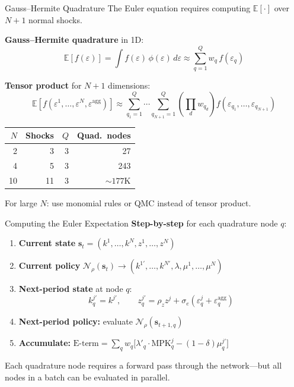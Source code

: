 \documentclass[aspectratio=169,11pt]{beamer}
\newcommand{\emphc}[1]{\textcolor{harvardcrimson}{#1}}
\newcommand{\E}[1]{\mathbb{E}\!\left[#1\right]}
\begin{document}
\begin{frame}{Gauss--Hermite Quadrature}
The Euler equation requires computing $\E{\cdot}$ over $N+1$ normal shocks.

\vspace{0.3em}
\textbf{Gauss--Hermite quadrature} in 1D:
\[
\E{f(\varepsilon)} = \int f(\varepsilon)\, \phi(\varepsilon)\,d\varepsilon \approx \sum_{q=1}^{Q} w_q \, f(\varepsilon_q)
\]

\vspace{0.3em}
\textbf{Tensor product} for $N+1$ dimensions:
\[
\E{f(\varepsilon^1, \ldots, \varepsilon^N, \varepsilon^{\text{agg}})} \approx \sum_{q_1=1}^{Q}\cdots\sum_{q_{N+1}=1}^{Q} \left(\prod_{d} w_{q_d}\right) f(\varepsilon_{q_1}, \ldots, \varepsilon_{q_{N+1}})
\]

\vspace{0.3em}
\begin{center}
\begin{tabular}{rrrr}
\toprule
$N$ & \textbf{Shocks} & $Q$ & \textbf{Quad.\ nodes} \\
\midrule
2 & 3 & 3 & 27 \\
4 & 5 & 3 & 243 \\
10 & 11 & 3 & $\sim 177$K \\
\bottomrule
\end{tabular}
\end{center}

{\small For large $N$: use monomial rules or QMC instead of tensor product.}
\end{frame}

\begin{frame}{Computing the Euler Expectation}
\textbf{Step-by-step} for each quadrature node $q$:

\vspace{0.3em}
\begin{enumerate}
    \item \textbf{Current state} $\bm{s}_t = (k^1, \ldots, k^N, z^1, \ldots, z^N)$
    \item \textbf{Current policy} $\mathcal{N}_\rho(\bm{s}_t) \to (k^{1\prime}, \ldots, k^{N\prime}, \lambda, \mu^1, \ldots, \mu^N)$
    \item \textbf{Next-period state} at node $q$:
    \[
    k^{j\prime}_q = k^{j\prime}, \qquad z^{j\prime}_q = \rho_z z^j + \sigma_e(\varepsilon^j_q + \varepsilon^{\text{agg}}_q)
    \]
    \item \textbf{Next-period policy:} evaluate $\mathcal{N}_\rho(\bm{s}_{t+1,q})$
    \item \textbf{Accumulate:} $\text{E-term} = \sum_q w_q \bigl[\lambda'_q \cdot \text{MPK}^j_q - (1-\delta)\mu^{j\prime}_q\bigr]$
\end{enumerate}

\vspace{0.3em}
{\small Each quadrature node requires a \emphc{forward pass} through the network---but all nodes in a batch can be evaluated in parallel.}
\end{frame}
\end{document}
